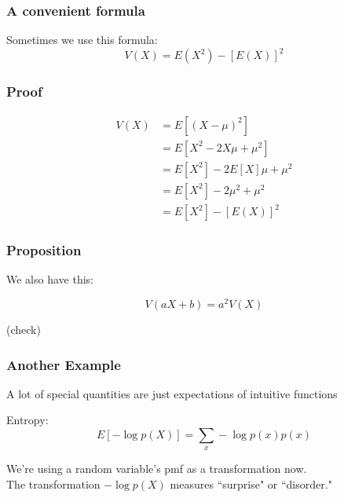 \documentclass{beamer}
\begin{document}
\begin{frame}
\frametitle{A convenient formula}

Sometimes we use this formula:
\[
V(X) = E(X^2) - [E(X)]^2
\]


\end{frame}



\begin{frame}
\frametitle{Proof}

\begin{align*}
V(X) &= E[(X - \mu)^2] \\
&= E[X^2 - 2X \mu + \mu^2] \\
&= E[X^2] - 2E[X]\mu + \mu^2 \\
&= E[X^2] - 2\mu^2 + \mu^2 \\
&= E[X^2] - [E(X)]^2 
\end{align*}


\end{frame}



\begin{frame}
\frametitle{Proposition}

We also have this:

\[
V(aX+b) = a^2V(X)
\]

(check)

\end{frame}


\begin{frame}
\frametitle{Another Example}

A lot of special quantities are just expectations of intuitive functions
\newline

Entropy:
$$
E[-\log p(X)] = \sum_x -\log p(x) p(x)
$$

We're using a random variable's pmf as a transformation now. \\

The transformation $-\log p(X)$ measures ``surprise" or ``disorder."
\end{frame}

\end{document}
